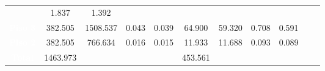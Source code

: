 \begin{table}[h]
{\begin{tabular}{|c|c|c|c|c|c|c|c|c|cc}
                                                                           & 1.837
                                                                                & 1.392
                                                                              &                                                                                           &                                                                                            \\ 
\hhline{|---------~~}
{\cellcolor[rgb]{0.255,0.255,0.255}}\textbf{\textcolor{white}{Piso 3}}   & 382.505
                                                                   & 1508.537
                                                                     & 0.043                                                                          & 0.039
                                                                          & 64.900
                                                                             & 59.320
                                                                             & 0.708
                                                                                & 0.591
                                                                              &                                                                                           &                                                                                            \\ 
\hhline{|---------~~}
{\cellcolor[rgb]{0.255,0.255,0.255}}\textbf{\textcolor{white}{Piso 2}}   & 382.505
                                                                   & 766.634
                                                                     & 0.016                                                                          & 0.015                                                                           & 11.933
                                                                            & 11.688
                                                                            & 0.093
                                                                               & 0.089
                                                                              &                                                                                           &                                                                                            \\ 
\hhline{|---------~~}
{\cellcolor[rgb]{0.255,0.255,0.255}}\textbf{\textcolor{white}{Total}}    & 1463.973
                                                                 & \multicolumn{1}{c}{}                                                         & \multicolumn{1}{c}{}                                                           &                                                                                 & 453.561

\end{tabular}}
\end{table}
